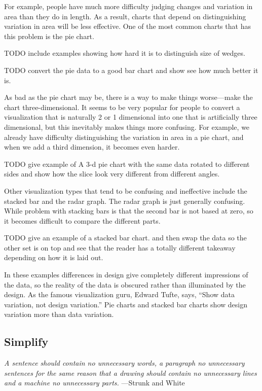 For example, people have much more difficulty judging changes and variation in area than they do in length.  
As a result, charts that depend on distinguishing variation in area will be less effective.  One of the most common charts that has this problem is the pie chart. 

TODO include examples showing how hard it is to distinguish size of wedges.

TODO convert the pie data to a good bar chart and show see how much better it is.

As bad as the pie chart may be, there is a way to make things worse---make the chart three-dimensional.  It seems to be very popular for people to convert a visualization that is naturally 2 or 1 dimensional into one that is artificially three dimensional, but this inevitably makes things more confusing.  For example, we already have difficulty distinguishing the variation in area in a pie chart, and when we add a third dimension, it becomes even harder.


TODO give example of A 3-d pie chart with the same data rotated to different sides and show how the slice look very different from different angles.


Other visualization types that tend to be confusing and ineffective include the stacked bar and the radar graph.  The radar graph is just generally confusing.  While problem with stacking bars is that the second bar is not based at zero, so it becomes difficult to compare the different parts.

TODO give an example of a stacked bar chart.  and then swap the data so the other set is on top and see that the reader has a totally different takeaway depending on how it is laid out.


In these examples differences in design give completely different impressions of the data, so the reality of the data is obscured rather than illuminated by the design.  As the famous visualization guru, Edward Tufte, says, ``Show data variation, not design variation.''  Pie charts and stacked bar charts show design variation more than data variation.


\subsection*{Simplify}

\noindent\emph{A sentence should contain no unnecessary words, a paragraph no unnecessary sentences for the same reason that a drawing should contain no unnecessary lines and a machine no unnecessary parts.} \small{---Strunk and White}


